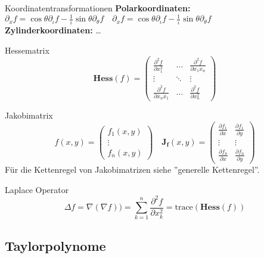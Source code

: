 \begin{Diverses}{Koordinatentransformationen}{}
    \textbf{Polarkoordinaten:}
    $\partial_x f = \cos{\theta} \partial_\iota f - \frac{1}{\iota}\sin{\theta}\partial_\theta f \quad
    \partial_x f = \cos{\theta} \partial_\iota f - \frac{1}{\iota}\sin{\theta}\partial_\theta f $\\
    \textbf{Zylinderkoordinaten:} \dots
\end{Diverses}

\begin{Definition}{Hessematrix}{}
\[
    \mathbf{Hess}(f) =
        \begin{pmatrix}
            \frac{\partial^2 f}{\partial x_1^2}&\hdots&\frac{\partial^2 f}{\partial x_1 x_n}\\
            \vdots&\ddots&\vdots\\
            \frac{\partial^2 f}{\partial x_n x_1}&\hdots&\frac{\partial^2 f}{\partial x_n^2}
        \end{pmatrix}
\]
\end{Definition}

\begin{Definition}{Jakobimatrix}{}
\[
    f(x, y) =
        \begin{pmatrix}
            f_1(x, y)\\
            \vdots\\
            f_n(x, y)
        \end{pmatrix} \quad
    \mathbf{J_f}(x, y) =
        \begin{pmatrix}
                \frac{\partial f_1}{\partial x} & \frac{\partial f_1}{\partial y}\\
                \vdots&\vdots\\
            \frac{\partial f_n}{\partial x} & \frac{\partial f_n}{\partial y}
        \end{pmatrix}
\]
Für die Kettenregel von Jakobimatrizen siehe ''generelle Kettenregel''.
\end{Definition}

\begin{Definition}{Laplace Operator}{}
\[
\Delta f = \nabla(\nabla f)) = \sum_{k=1}^{n} \frac{\partial^2 f}{\partial x_k^2} = \text{trace}(\textbf{Hess}(f))
\]
\end{Definition}

\subsection{Taylorpolynome}

